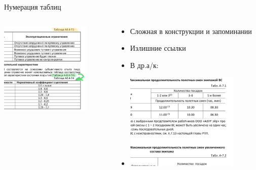 \documentclass[utf8]{beamer}
\begin{document}
\begin{frame}{Нумерация таблиц}
    \begin{columns}[T,onlytextwidth]
            \begin{column}{0.48\textwidth}
                \includegraphics[width=0.8\textwidth]{Complex1.png}                                     
            \end{column}
            \begin{column}{0.48\textwidth}
                \begin{itemize}
                    \item<1-> Сложная в конструкции и запоминании
                    \item<2-> Излишние ссылки
                    \item<3-> В др.а/к:
                    \item<3-> \includegraphics[width=0.8\textwidth]{AzurTables.png}
            \end{itemize}    
            \end{column}
    \end{columns}    
\end{frame}
\end{document}
